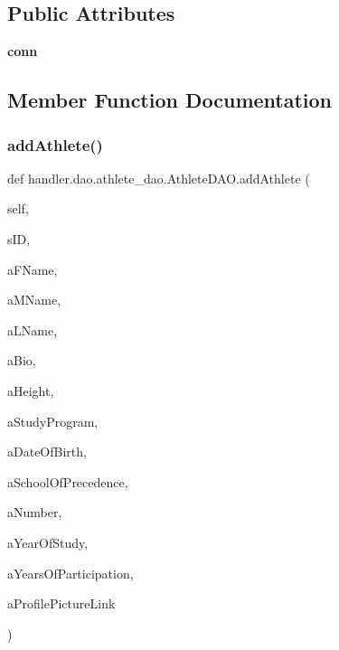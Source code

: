 \subsection*{Public Attributes}
\begin{DoxyCompactItemize}
\item 
\mbox{\label{classhandler_1_1dao_1_1athlete__dao_1_1_athlete_d_a_o_af4e1dac056a1885b6b60eed1faea3b48}} 
{\bfseries conn}
\end{DoxyCompactItemize}


\subsection{Member Function Documentation}
\mbox{\label{classhandler_1_1dao_1_1athlete__dao_1_1_athlete_d_a_o_a8d63542ce2b12f1e736ad2dc718b07cd}} 
\subsubsection{\texorpdfstring{add\+Athlete()}{addAthlete()}}
{\footnotesize\ttfamily def handler.\+dao.\+athlete\+\_\+dao.\+Athlete\+D\+A\+O.\+add\+Athlete (\begin{DoxyParamCaption}\item[{}]{self,  }\item[{}]{s\+ID,  }\item[{}]{a\+F\+Name,  }\item[{}]{a\+M\+Name,  }\item[{}]{a\+L\+Name,  }\item[{}]{a\+Bio,  }\item[{}]{a\+Height,  }\item[{}]{a\+Study\+Program,  }\item[{}]{a\+Date\+Of\+Birth,  }\item[{}]{a\+School\+Of\+Precedence,  }\item[{}]{a\+Number,  }\item[{}]{a\+Year\+Of\+Study,  }\item[{}]{a\+Years\+Of\+Participation,  }\item[{}]{a\+Profile\+Picture\+Link }\end{DoxyParamCaption})}



